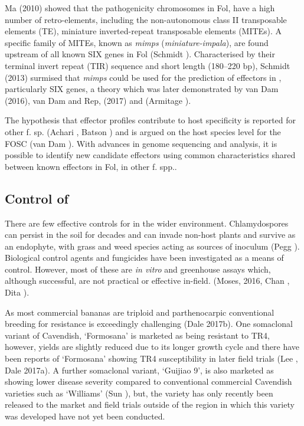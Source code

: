 Ma \et (2010) showed that the pathogenicity chromosomes in Fol, have a high number of retro-elements, including the non-autonomous class II transposable elements (TE), miniature inverted-repeat transposable elements (MITEs). A specific family of MITEs, known as \textit{mimps} (\textit{miniature-impala}), are found upstream of all known SIX genes in Fol (Schmidt ). Characterised by their terminal invert repeat (TIR) sequence and short length (180–220 bp), Schmidt \et (2013) surmised that \textit{mimps} could be used for the prediction of effectors in \Fo, particularly SIX genes, a theory which was later demonstrated by van Dam \et (2016), van Dam and Rep, (2017) and (Armitage ). 

The hypothesis that effector profiles contribute to host specificity is reported for other f. sp. (Achari , Batson ) and is argued on the host species level for the FOSC (van Dam ). With advances in genome sequencing and analysis, it is possible to identify new candidate effectors using common characteristics shared between known effectors in Fol, in other f. spp..

\subsection{Control of \Focub}
There are few effective controls for \Foc in the wider environment. Chlamydospores can persist in the soil for decades and \Foc can invade non-host plants and survive as an endophyte, with grass and weed species acting as sources of inoculum (Pegg ). Biological control agents and fungicides have been investigated as a means of \Foc control. However, most of these are \textit{in vitro} and greenhouse assays which, although successful, are not practical or effective in-field. (Moses, 2016, Chan , Dita ).  

As most commercial bananas are triploid and parthenocarpic conventional breeding for resistance is exceedingly challenging (Dale \et 2017b). One somaclonal variant of Cavendish, ‘Formosana’ is marketed as being resistant to TR4, however, yields are slightly reduced due to its longer growth cycle and there have been reports of  ‘Formosana’ showing TR4 susceptibility in later field trials (Lee , Dale \et 2017a). A further somaclonal variant, ‘Guijiao 9’, is also marketed as showing lower disease severity compared to conventional commercial Cavendish varieties such as ‘Williams’ (Sun ), but, the variety has only recently been released to the market and field trials outside of the region in which this variety was developed have not yet been conducted.  

